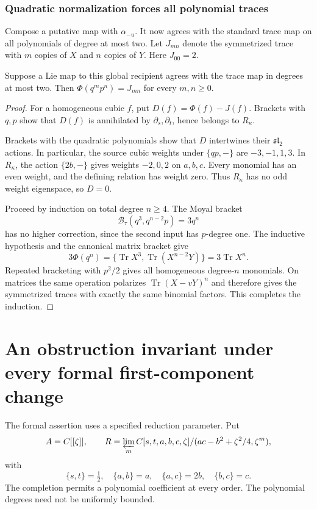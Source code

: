 \subsubsection{Quadratic normalization forces all polynomial traces}

Compose a putative map with $\alpha_{-u}$. It now agrees with the
standard trace map on all polynomials of degree at most two.
Let $J_{mn}$ denote the symmetrized trace with $m$ copies of $X$
and $n$ copies of $Y$. Here $J_{00}=2$.

\begin{lemma}\label{mht:frgl:lem:global-rigidity}
Suppose a Lie map to this global recipient agrees with the trace map
in degrees at most two. Then
$\Phi(q^mp^n)=J_{mn}$ for every $m,n\ge0$.
\end{lemma}

\begin{proof}
For a homogeneous cubic $f$, put $D(f)=\Phi(f)-J(f)$.
Brackets with $q,p$ show that $D(f)$ is annihilated by
$\partial_s,\partial_t$, hence belongs to $R_\kappa$.

Brackets with the quadratic polynomials show that $D$ intertwines
their $\mathfrak{sl}_2$ actions. In particular, the source cubic
weights under $\{qp,-\}$ are $-3,-1,1,3$. In $R_\kappa$,
the action $\{2b,-\}$ gives weights $-2,0,2$ on $a,b,c$.
Every monomial has an even weight, and the defining relation
has weight zero. Thus $R_\kappa$ has no odd weight eigenspace,
so $D=0$.

Proceed by induction on total degree $n\ge4$. The Moyal bracket
\[
 \mathcal B_\tau(q^3,q^{n-2}p)=3q^n
\]
has no higher correction, since the second input has $p$-degree
one. The inductive hypothesis and the canonical matrix bracket
give
\[
 3\Phi(q^n)
 =\{\operatorname{Tr}X^3,\operatorname{Tr}(X^{n-2}Y)\}
 =3\operatorname{Tr}X^n.
\]
Repeated bracketing with $p^2/2$ gives all homogeneous degree-$n$
monomials. On matrices the same operation polarizes
$\operatorname{Tr}(X-vY)^n$ and therefore gives the symmetrized
traces with exactly the same binomial factors. This completes
the induction.
\end{proof}

\section{An obstruction invariant under every formal first-component change}
\label{mht:frgl:sec:formal-all-corrections}

The formal assertion uses a specified reduction parameter. Put
\[
 A=\mathbb C[[\zeta]],\qquad
 \widehat R=\varprojlim_m
 \mathbb C[s,t,a,b,c,\zeta]/
  (ac-b^2+\zeta^2/4,\zeta^m),
\]
with
\[
 \{s,t\}=\tfrac12,\quad\{a,b\}=a,\quad
 \{a,c\}=2b,\quad\{b,c\}=c.
\]
The completion permits a polynomial coefficient at every order. The polynomial degrees need not be uniformly bounded.

